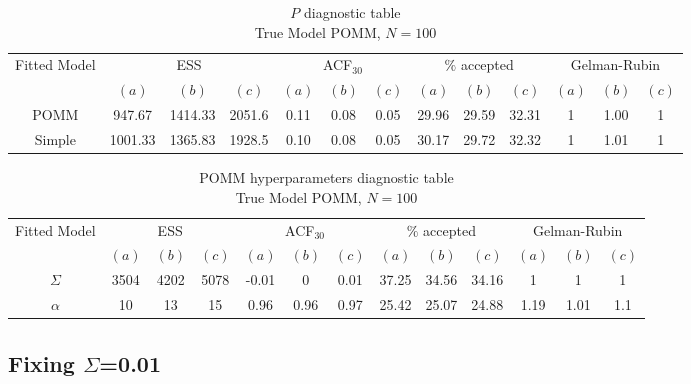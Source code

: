 \documentclass[11pt]{amsart}
\begin{document}
\begin{table}[htbp]
\centering
\caption*{
{\large $P$ diagnostic table} \\ 
{\small True Model POMM, $N=100$}
} 
\begin{tabular}{ccccccccccccc}
\toprule
\multirow{2}{*}{Fitted Model} & \multicolumn{3}{c}{ESS} & \multicolumn{3}{c}{
ACF$_{30}$} & \multicolumn{3}{c}{$\%$ accepted} & \multicolumn{3}{c}{Gelman-Rubin}\\
\cmidrule(lr){2-4} \cmidrule(lr){5-7} \cmidrule(lr){8-10} \cmidrule(lr){11-13} 
& $(a)$ & $(b)$ & $(c)$ & $(a)$ & $(b)$ & $(c)$ & $(a)$ & $(b)$ & $(c)$ & $(a)$ & $(b)$ & $(c)$ \\
\midrule
POMM &947.67 & 1414.33 & 2051.6 & 0.11 & 0.08 & 0.05 & 29.96 & 29.59 & 32.31 & 1 & 1.00 & 1 \\
Simple &1001.33 & 1365.83 & 1928.5 & 0.10 & 0.08 & 0.05 & 30.17 & 29.72 & 32.32 & 1 & 1.01 & 1\\
\bottomrule
\end{tabular}
\label{table:P_diagnostic_simple}
\end{table}


\begin{table}[htbp]
\centering
\caption*{
{\large POMM hyperparameters diagnostic table} \\ 
{\small True Model POMM, $N=100$}
} 
\begin{tabular}{ccccccccccccc}
\toprule
\multirow{2}{*}{Fitted Model} & \multicolumn{3}{c}{ESS} & \multicolumn{3}{c}{
ACF$_{30}$} & \multicolumn{3}{c}{$\%$ accepted} & \multicolumn{3}{c}{Gelman-Rubin}\\
\cmidrule(lr){2-4} \cmidrule(lr){5-7} \cmidrule(lr){8-10} \cmidrule(lr){11-13} 
& $(a)$ & $(b)$ & $(c)$ & $(a)$ & $(b)$ & $(c)$ & $(a)$ & $(b)$ & $(c)$ & $(a)$ & $(b)$ & $(c)$ \\
\midrule
$\Sigma$ &3504 & 4202 & 5078 & -0.01 & 0 & 0.01 & 37.25 & 34.56 & 34.16 & 1 & 1 & 1 \\
$\alpha$ &10 & 13 & 15 & 0.96 & 0.96 & 0.97 & 25.42 & 25.07 & 24.88 & 1.19 & 1.01 & 1.1     \\
\bottomrule
\end{tabular}
\label{table:simulations_from_simple}
\end{table}

\clearpage

\subsection{Fixing $\Sigma$=0.01}
\end{document}
